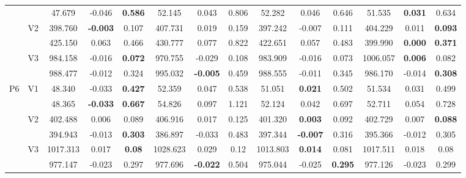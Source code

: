 \documentclass[12pt,a4paper]{article}
\begin{document}
\begin{sidewaystable}[ht]
{\begin{tabular}{cc|ccc|ccc|ccc|ccc|}
   &  & 47.679 & -0.046 & \textbf{0.586} & 52.145 & 0.043 & 0.806 & 52.282 & 0.046 & 0.646 & 51.535 & \textbf{0.031} & 0.634 \\ 
   & \multirow{2}{*}{V2} & 398.760 & \textbf{-0.003} & 0.107 & 407.731 & 0.019 & 0.159 & 397.242 & -0.007 & 0.111 & 404.229 & 0.011 & \textbf{0.093} \\ 
   &  & 425.150 & 0.063 & 0.466 & 430.777 & 0.077 & 0.822 & 422.651 & 0.057 & 0.483 & 399.990 & \textbf{0.000} & \textbf{0.371} \\ 
   & \multirow{2}{*}{V3} & 984.158 & -0.016 & \textbf{0.072} & 970.755 & -0.029 & 0.108 & 983.909 & -0.016 & 0.073 & 1006.057 & \textbf{0.006} & 0.082 \\ 
   &  & 988.477 & -0.012 & 0.324 & 995.032 & \textbf{-0.005} & 0.459 & 988.555 & -0.011 & 0.345 & 986.170 & -0.014 & \textbf{0.308} \\ 
   \hline \hline\multirow{6}{*}{P6} & \multirow{2}{*}{V1} & 48.340 & -0.033 & \textbf{0.427} & 52.359 & 0.047 & 0.538 & 51.051 & \textbf{0.021} & 0.502 & 51.534 & 0.031 & 0.499 \\ 
   &  & 48.365 & \textbf{-0.033} & \textbf{0.667} & 54.826 & 0.097 & 1.121 & 52.124 & 0.042 & 0.697 & 52.711 & 0.054 & 0.728 \\ 
   & \multirow{2}{*}{V2} & 402.488 & 0.006 & 0.089 & 406.916 & 0.017 & 0.125 & 401.320 & \textbf{0.003} & 0.092 & 402.729 & 0.007 & \textbf{0.088} \\ 
   &  & 394.943 & -0.013 & \textbf{0.303} & 386.897 & -0.033 & 0.483 & 397.344 & \textbf{-0.007} & 0.316 & 395.366 & -0.012 & 0.305 \\ 
   & \multirow{2}{*}{V3} & 1017.313 & 0.017 & \textbf{0.08} & 1028.623 & 0.029 & 0.12 & 1013.803 & \textbf{0.014} & 0.081 & 1017.511 & 0.018 & 0.08 \\ 
   &  & 977.147 & -0.023 & 0.297 & 977.696 & \textbf{-0.022} & 0.504 & 975.044 & -0.025 & \textbf{0.295} & 977.126 & -0.023 & 0.299 \\ 
   \hline
\end{tabular}
}
\end{sidewaystable}
\end{document}
